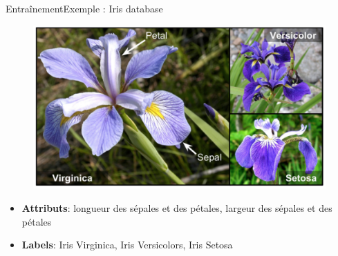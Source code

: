 \documentclass[compress]{beamer}
\begin{document}
\begin{frame}{Entraînement}{Exemple : Iris database}
  \begin{figure}
    \centering
    \includegraphics[width=0.7\linewidth]{resources/iris}
  \end{figure}
  \vspace{-.05\linewidth}
  \begin{itemize}
    \item \textbf{\color{fibeamer@orange}Attributs}: longueur des sépales et des pétales, largeur des sépales et des pétales
    \item \textbf{\color{fibeamer@orange}Labels}: Iris Virginica, Iris Versicolors, Iris Setosa
  \end{itemize}
\end{frame}
\end{document}
